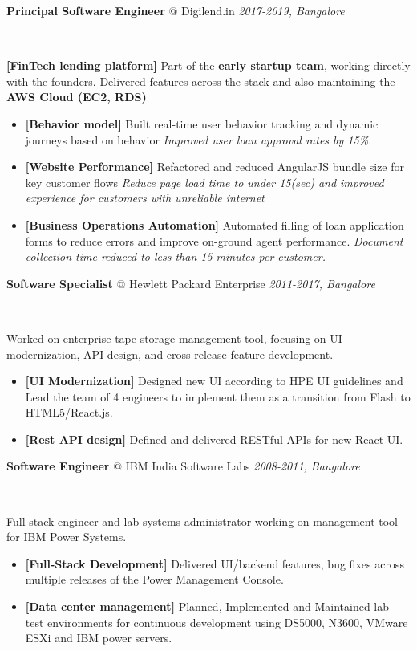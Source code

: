 \documentclass[11pt]{article}
\makeatletter
\newcommand{\roleheader}[3]{%
  {\large\sffamily\textbf{#1} @ #2} \hfill \textit{#3}\\[-0.3em]
  \color{myblue}\rule{\linewidth}{1pt}\\[0.5em]\color{bodytext}
}
\newenvironment{experiencebullets}{%
  \begin{itemize}[leftmargin=1.25em, itemsep=-0.25em]
    \renewcommand{\labelitemi}{\textbullet}
}{%
  \end{itemize}
}
\newenvironment{experience}[4]{%
  \roleheader{#1}{#2}{#3}%
  #4\vspace{0.5em}%
}{%
  \vspace{1em}
}
\newcommand{\expbullet}[3]{%
  \item \textbf{[#1]} {#2} \textrightarrow{} \textit{#3}%
}
\makeatother
\begin{document}
\begin{experience}{Principal Software Engineer}{Digilend.in}{2017-2019, Bangalore}
  {\textbf{[FinTech lending platform]} Part of the \textbf{early startup team},
    working directly with the founders. Delivered features across the stack and also maintaining the \textbf{AWS Cloud (EC2, RDS)}
  }
  \begin{experiencebullets}
    \expbullet {Behavior model}{Built real-time user behavior tracking and dynamic journeys based on behavior}{Improved user loan approval rates by 15\%.}
    \expbullet {Website Performance}{Refactored and reduced AngularJS bundle size for key customer flows}{Reduce page load time to under 15(sec) and improved experience for customers with unreliable internet}
    \expbullet {Business Operations Automation}{Automated filling of loan application forms to reduce errors and improve on-ground agent performance.}{Document collection time reduced to less than 15 minutes per customer.}
  \end{experiencebullets}
\end{experience}


\begin{experience}{Software Specialist}{Hewlett Packard Enterprise}{2011-2017, Bangalore}{Worked on enterprise tape storage management tool, focusing on UI modernization, API design, and cross-release feature development.}
  \begin{experiencebullets}
    \item \textbf{[UI Modernization]} Designed new UI according to HPE UI guidelines and Lead the team of 4 engineers to implement them as a transition from Flash to HTML5/React.js.
    \item \textbf{[Rest API design]} Defined and delivered RESTful APIs for new React UI.
  \end{experiencebullets}
\end{experience}

\begin{experience}{Software Engineer}{IBM India Software Labs}{2008-2011, Bangalore}{Full-stack engineer and lab systems administrator working on management tool for IBM Power Systems.}
  \begin{experiencebullets}
    \item \textbf{[Full-Stack Development]} Delivered UI/backend features, bug fixes across multiple releases of the Power Management Console.
    \item \textbf{[Data center management]} Planned, Implemented and Maintained lab test environments for continuous development using DS5000, N3600, VMware ESXi and IBM power servers.
  \end{experiencebullets}
\end{experience}
\end{document}
